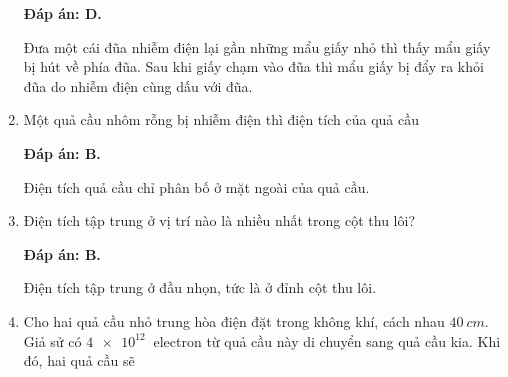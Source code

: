 \begin{enumerate}[label=\bfseries Câu \arabic*:]
{	}
	\loigiai
	{	\textbf{Đáp án: D.}
		
		Đưa một cái đũa nhiễm điện lại gần những mẩu giấy nhỏ thì thấy mẩu giấy bị hút về phía đũa. Sau khi giấy chạm vào đũa thì mẩu giấy bị đẩy ra khỏi đũa do nhiễm điện cùng dấu với đũa.
	}
	\item {}
	
	\cauhoi
	{Một quả cầu nhôm rỗng bị nhiễm điện thì điện tích của quả cầu
		
	}
	\loigiai
	{	\textbf{Đáp án: B.}
		
		Điện tích quả cầu chỉ phân bố ở mặt ngoài của quả cầu.
	}
	\item {}
	
	\cauhoi
	{Điện tích tập trung ở vị trí nào là nhiều nhất trong cột thu lôi?
		
	}
	\loigiai
	{	\textbf{Đáp án: B.}
		
		Điện tích tập trung ở đầu nhọn, tức là ở đỉnh cột thu lôi.
	}
	\item {}
	
	\cauhoi
	{Cho hai quả cầu nhỏ trung hòa điện đặt trong không khí, cách nhau $\SI{40}{cm}$. Giả sử có $\SI{4e12}{}$ electron từ quả cầu này di chuyển sang quả cầu kia. Khi đó, hai quả cầu sẽ
		
}
\end{enumerate}
